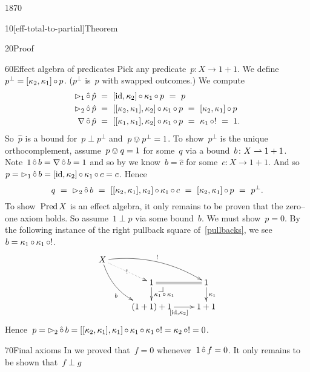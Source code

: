 \begin{parsec}{1870}
\begin{point}{10}[eff-total-to-partial]{Theorem}
\begin{point}{20}{Proof}
\begin{point}{60}{Effect algebra of predicates}%
Pick any predicate~$p \colon X \to 1+1$.
We define~$p^\perp = [\kappa_2,\kappa_1]\mathop{\circ} p$.
($p^\perp$ is~$p$ with swapped outcomes.)
We compute
\begin{align*}
    \mathord{\vartriangleright}_1 \mathop{\hat\circ} \hat{p}
    &\ = \ [\mathrm{id},\kappa_2]\mathop{\circ}\kappa_1 \mathop{\circ} p
        \  = \ p \\
        \mathord{\vartriangleright}_2 \mathop{\hat\circ} \hat{p}
    &\ = \ [[\kappa_2, \kappa_1],\kappa_2]\mathop{\circ}\kappa_1 \mathop{\circ} p
        \  = \ [\kappa_2,\kappa_1]\mathop{\circ} p \\
    \nabla \mathop{\hat\circ} \hat{p}
    &\ = \ [[\kappa_1,\kappa_1],\kappa_2]\mathop{\circ}\kappa_1 \mathop{\circ} p
        \  = \ \kappa_1 \mathop{\circ} ! \ = \ 1.
\end{align*}
So~$\hat{p}$ is a bound for~$p \perp p^\perp$
and~$p \ovee p^\perp = 1$.
To show~$p^\perp$ is the unique orthocomplement,
    assume~$p \ovee q = 1$ for some~$q$ via a bound~$b\colon
        X \rightharpoonup 1+1$.
Note~$1 \mathop{\hat\circ} b =\nabla \mathop{\hat\circ} b = 1$
    and so by 
    we know~$b = \hat{c}$ for some~$c\colon X \to 1+1$.
    And so~$p = \mathord{\vartriangleright}_1 \mathop{\hat\circ} b = [\mathrm{id}, \kappa_2]\mathop{\circ} \kappa_1 \mathop{\circ} c
                    = c$. Hence
\begin{equation*}
q \ =\  \pproj_2 \hafter b \ =\  [[\kappa_2, \kappa_1],\kappa_2] \after
    \kappa_1\after c \ =\  [\kappa_2,\kappa_1]\after p \ =\  p^\perp.
\end{equation*}
To show~$\operatorname{Pred} X$ is an effect algebra,
it only remains to be proven that the zero--one axiom holds.
So assume~$1 \perp p$ via some bound~$b$. We must show~$p=0$.
By the following instance of the right pullback square of~\eqref{pullbacks},
    we see~$b = \kappa_1 \mathop{\circ} \kappa_1 \mathop{\circ} !$.
\begin{equation*}
    \xymatrix@R-.8pc{
        X \ar@{.>}[rd]|{!}
    \ar@/^1pc/[rrd]^{!}
        \ar@/_1pc/[rdd]_b
        \\& 1 \pullback
        \ar@{=}[r]
        \ar[d]^{\kappa_1\after\kappa_1}
    & 1
        \ar[d]^{\kappa_1}
        \\& (1+1)+1
        \ar[r]_{[\id,\kappa_2]}
&1+1
}
\end{equation*}
Hence~$p = \mathord{\vartriangleright}_2 \mathop{\hat\circ} b = [[\kappa_2,\kappa_1],\kappa_1]\mathop{\circ}
                        \kappa_1 \mathop{\circ} \kappa_1 \mathop{\circ} ! = \kappa_2 \mathop{\circ} ! = 0$.
\end{point}
\begin{point}{70}{Final axioms}%
In  we proved that~$f = 0$ whenever~$1 \mathop{\hat\circ} f = 0$.
It only remains to be shown that~$f \perp g$

\end{point}
\end{point}
\end{point}
\end{parsec}
